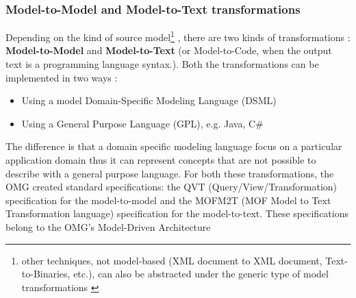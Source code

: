 \subsubsection{Model-to-Model and Model-to-Text transformations}
\label{m2m&m2t}
Depending on the kind of source model\footnote{other techniques, not model-based (XML document to XML document, Text-to-Binaries, etc.), can also be abstracted under the generic type of model transformations \cite{M2TandM2M}} , there are two kinds of transformations \cite{Papa11}: \textbf{Model-to-Model} and \textbf{Model-to-Text} (or Model-to-Code, when the output text is a programming language syntax.). Both the transformations can be implemented in two ways \cite{M2TandM2M}:
\begin{itemize}
 \item Using a model Domain-Specific Modeling Language (DSML)
 \item Using a General Purpose Language (GPL), e.g. Java, C\#
\end{itemize}
The difference is that a domain specific modeling language focus on a particular application domain thus it can represent concepts that are not possible to describe with a general purpose language.
For both these transformations, the OMG created standard specifications: the QVT (Query/View/Transformation) specification for the model-to-model and the MOFM2T (MOF Model to Text Transformation language) specification for the model-to-text. These specifications belong to the OMG's Model-Driven Architecture

